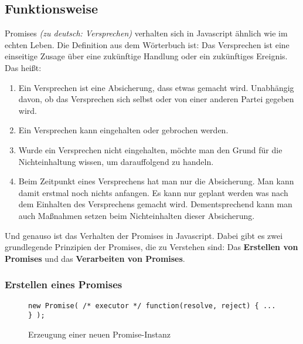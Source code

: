 \subsection{Funktionsweise}

\noindent
Promises \textit{(zu deutsch: Versprechen)}  verhalten sich in Javascript ähnlich wie im echten Leben. Die Definition aus dem Wörterbuch ist: Das Versprechen ist eine einseitige Zusage über eine zukünftige Handlung oder ein zukünftiges Ereignis. \cite{versprechen} \\

\noindent
Das heißt:

\begin{enumerate}
    \item Ein Versprechen ist eine Absicherung, dass etwas gemacht wird. Unabhängig davon, ob das Versprechen sich selbst oder von einer anderen Partei gegeben wird.
    
    \item Ein Versprechen kann eingehalten oder gebrochen werden.
    
    \item Wurde ein Versprechen nicht eingehalten, möchte man den Grund für die Nichteinhaltung wissen, um darauffolgend zu handeln.
    
    \item Beim Zeitpunkt eines Versprechens hat man nur die Absicherung. Man kann damit erstmal noch nichts anfangen. Es kann nur geplant werden was nach dem Einhalten des Versprechens gemacht wird. Dementsprechend kann man auch Maßnahmen setzen beim Nichteinhalten dieser Absicherung.
    
\end{enumerate}

\noindent
Und genauso ist das Verhalten der Promises in Javascript. Dabei gibt es zwei grundlegende Prinzipien der Promises, die zu Verstehen sind: Das \textbf{Erstellen von Promises} und das \textbf{Verarbeiten von Promises}.

\subsubsection{Erstellen eines Promises}

\begin{figure}[H]
\begin{lstlisting}
new Promise( /* executor */ function(resolve, reject) { ... } );
\end{lstlisting}
\caption{Erzeugung einer neuen Promise-Instanz}
\end{figure}

